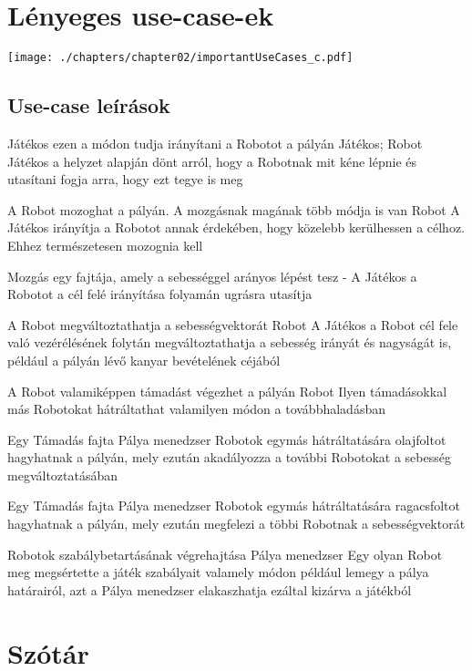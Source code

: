 \section{Lényeges use-case-ek}
\texttt{[image: ./chapters/chapter02/importantUseCases\_c.pdf]}

\subsection{Use-case leírások}

%
{Játékos ezen a módon tudja irányítani a Robotot a pályán}%
{Játékos; Robot}%
{Játékos a helyzet alapján dönt arról, hogy a Robotnak mit kéne lépnie és utasítani fogja arra, hogy ezt tegye is meg}

%
{A Robot mozoghat a pályán. A mozgásnak magának több módja is van}
{Robot}
{A Játékos irányítja a Robotot annak érdekében, hogy közelebb kerülhessen a célhoz. Ehhez természetesen mozognia kell}

%
{Mozgás egy fajtája, amely a sebességgel arányos lépést tesz}%
{-}%
{A Játékos a Robotot a cél felé irányítása folyamán ugrásra utasítja}

%
{A Robot megváltoztathatja a sebességvektorát}%
{Robot}%
{A Játékos a Robot cél fele való vezérélésének folytán megváltoztathatja a sebesség irányát és nagyságát is, például a pályán lévő kanyar bevételének céjából}

%
{A Robot valamiképpen támadást végezhet a pályán}%
{Robot}%
{Ilyen támadásokkal más Robotokat hátráltathat valamilyen módon a továbbhaladásban}

%
{Egy Támadás fajta}%
{Pálya menedzser}%
{Robotok egymás hátráltatására olajfoltot hagyhatnak a pályán, mely ezután akadályozza a további Robotokat a sebesség megváltoztatásában}

%
{Egy Támadás fajta}%
{Pálya menedzser}%
{Robotok egymás hátráltatására ragacsfoltot hagyhatnak a pályán, mely ezután megfelezi a többi Robotnak a sebességvektorát}

%
{Robotok szabálybetartásának végrehajtása}%
{Pálya menedzser}%
{Egy olyan Robot meg megsértette a játék szabályait valamely módon például lemegy a pálya határairól, azt a Pálya menedzser elakaszhatja ezáltal kizárva a játékból}

\section{Szótár}

